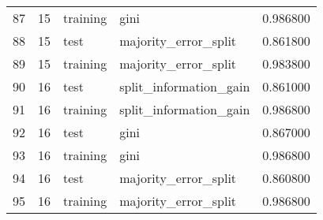 \begin{tabular}{lrllr}
87 & 15 & training & gini & 0.986800 \\
88 & 15 & test & majority_error_split & 0.861800 \\
89 & 15 & training & majority_error_split & 0.983800 \\
90 & 16 & test & split_information_gain & 0.861000 \\
91 & 16 & training & split_information_gain & 0.986800 \\
92 & 16 & test & gini & 0.867000 \\
93 & 16 & training & gini & 0.986800 \\
94 & 16 & test & majority_error_split & 0.860800 \\
95 & 16 & training & majority_error_split & 0.986800 \\
\end{tabular}

